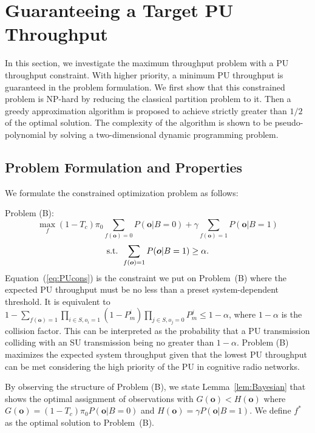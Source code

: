 \documentclass[conference]{IEEEtran}
\begin{document}
\section{Guaranteeing a Target PU Throughput}
\label{sec:PU_thru}
In this section, we investigate the maximum throughput problem with a PU throughput constraint. With higher priority, a minimum PU throughput is guaranteed in the problem formulation. We first show that this constrained problem is NP-hard by reducing the classical partition problem \cite{Garey} to it. Then a greedy approximation algorithm is proposed to achieve strictly greater than $1/2$ of the optimal solution. The complexity of the algorithm is shown to be pseudo-polynomial by solving a two-dimensional dynamic programming problem. 

\subsection{Problem Formulation and Properties}
\label{subsec:form}
We formulate the constrained optimization problem as follows:

Problem (B):
\vspace{-0.5em}
\[\max\limits_{f}{(1-T_c){\pi}_0 \sum\limits_{f(\boldsymbol{o})=0}{P(\boldsymbol{o}|B=0)}+\gamma \sum\limits_{f(\boldsymbol{o})=1}{P(\boldsymbol{o}|B=1)}}\]
\vspace{-0.8em}
\begin{equation}
\mbox{s.t. }\sum\limits_{f(\boldsymbol{o})=1}{P(\boldsymbol{o}|B=1)}\ge \alpha .
\vspace{-0.5em}
\label{eq:PUcons} 
\end{equation}
Equation~(\ref{eq:PUcons}) is the constraint we put on Problem~(B) where the expected PU throughput must be no less than a preset system-dependent threshold. It is equivalent to $1-\sum\limits_{f(\boldsymbol{o})=1}{\prod\limits_{i\in S,o_i=1}{(1-P_m^i)}\prod\limits_{j\in S,o_j=0}{P_m^j}}\le 1-\alpha $, where $1-\alpha$ is the collision factor. This can be interpreted as the probability that a PU transmission colliding with an SU transmission being no greater than $1-\alpha$. Problem (B) maximizes the expected system throughput given that the lowest PU throughput can be met considering the high priority of the PU in cognitive radio networks.

By observing the structure of Problem (B), we state Lemma~\ref{lem:Bayesian} that shows the optimal assignment of observations with $G(\boldsymbol{o})<H(\boldsymbol{o})$ where $G(\boldsymbol{o})=(1-T_c){\pi}_0 P(\boldsymbol{o}|B=0)$ and 
$H(\boldsymbol{o})=\gamma P(\boldsymbol{o}|B=1)$. We define $f^*$ as the optimal solution to Problem~(B).
\end{document}
